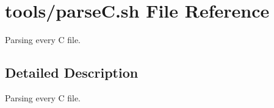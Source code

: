\hypertarget{parseC_8sh}{}\section{tools/parseC.sh File Reference}
\label{parseC_8sh}


Parsing every C file.  




\subsection{Detailed Description}
Parsing every C file. 

